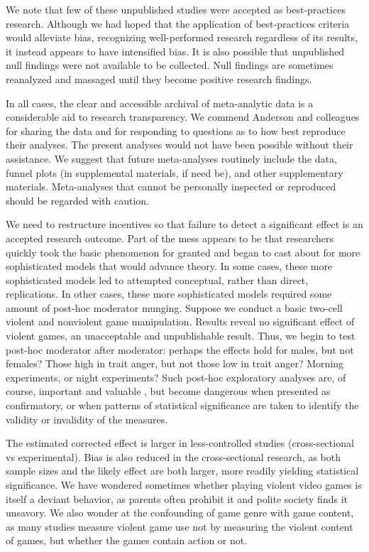 \documentclass[man]{apa6}
\begin{document}
We note that few of these unpublished studies were accepted as best-practices research. Although we had hoped that the application of best-practices criteria would alleviate bias, recognizing well-performed research regardless of its results, it instead appears to have intensified bias. It is also possible that unpublished null findings were not available to be collected. Null findings are sometimes reanalyzed and massaged until they become positive research findings.

In all cases, the clear and accessible archival of meta-analytic data is a considerable aid to research transparency. We commend Anderson and colleagues for sharing the data and for responding to questions as to how best reproduce their analyses. The present analyses would not have been possible without their assistance. We suggest that future meta-analyses routinely include the data, funnel plots (in supplemental materials, if need be), and other supplementary materials. Meta-analyses that cannot be personally inspected or reproduced should be regarded with caution.

We need to restructure incentives so that failure to detect a significant effect is an accepted research outcome. %
Part of the mess appears to be that researchers quickly took the basic phenomenon for granted and began to cast about for more sophisticated models that would advance theory. In some cases, these more sophisticated models led to attempted conceptual, rather than direct, replications. In other cases, these more sophisticated models required some amount of post-hoc moderator munging. Suppose we conduct a basic two-cell violent and nonviolent game manipulation. Results reveal no significant effect of violent games, an unacceptable and unpublishable result. Thus, we begin to test post-hoc moderator after moderator: perhaps the effects hold for males, but not females? Those high in trait anger, but not those low in trait anger? Morning experiments, or night experiments? Such post-hoc exploratory analyses are, of course, important and valuable \citep[indeed, we present them ourselves in][]{Engelhardt:etal:2014}, but become dangerous when presented as confirmatory, or when patterns of statistical significance are taken to identify the validity or invalidity of the measures.

The estimated corrected effect is larger in less-controlled studies (cross-sectional vs experimental). Bias is also reduced in the cross-sectional research, as both sample sizes and the likely effect are both larger, more readily yielding statistical significance. 
We have wondered sometimes whether playing violent video games is itself a deviant behavior, as parents often prohibit it and polite society finds it unsavory. We also wonder at the confounding of game genre with game content, as many studies %
measure violent game use not by measuring the violent content of games, but whether the games contain action or not.
\end{document}
